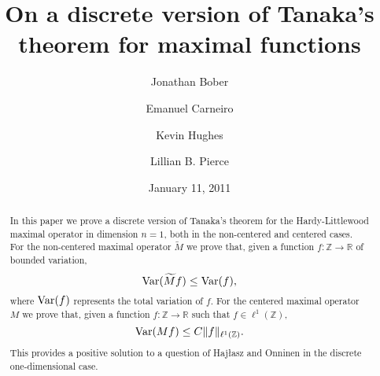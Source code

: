 \documentclass[reqno]{amsart}
\theoremstyle{definition}
\theoremstyle{remark}
\numberwithin{equation}{section}
\newcommand{\R}{\mathbb{R}}
\newcommand{\Z}{\mathbb{Z}}
\newcommand{\wM}{\widetilde{M}}
\newcommand{\Var}{\text{\rm Var}}
\begin{document}
\title[Discrete Tanaka's Theorem]{On a discrete version of Tanaka's theorem for maximal functions}

\author[Bober]{Jonathan Bober}
\address{School of Mathematics, Institute for Advanced Study, Einstein Drive, Princeton, NJ, 08540.}

\author[Carneiro]{Emanuel Carneiro}
\address{School of Mathematics, Institute for Advanced Study, Einstein Drive, Princeton, NJ, 08540.}

\author[Hughes]{Kevin Hughes}
\address{Department of Mathematics, Princeton University, Fine Hall, Washington Road, Princeton, NJ, 08544}

\author[Pierce]{Lillian B. Pierce}
\address{School of Mathematics, Institute for Advanced Study, Einstein Drive, Princeton, NJ, 08540.}





\date{January 11, 2011}




\begin{abstract}
In this paper we prove a discrete version of Tanaka's theorem \cite{Ta} for the Hardy-Littlewood maximal operator in dimension $n=1$, both in the non-centered and centered cases. For the non-centered maximal operator $\wM  $ we prove that, given a function $f: \Z \to \R$ of bounded variation, %
$$\Var(\wM  f) \leq \Var(f),$$
where $\Var(f)$ represents the total variation of $f$. For the centered maximal operator $M$ we prove that, given a function $f: \Z \to \R$ such that $f \in \ell^1(\Z)$,  %
$$\Var(Mf) \leq C \|f\|_{\ell^1(\Z)}.$$
This provides a positive solution to a question of Haj\l asz and Onninen \cite{HO} in the discrete one-dimensional case. 
\end{abstract}

\maketitle
\end{document}
